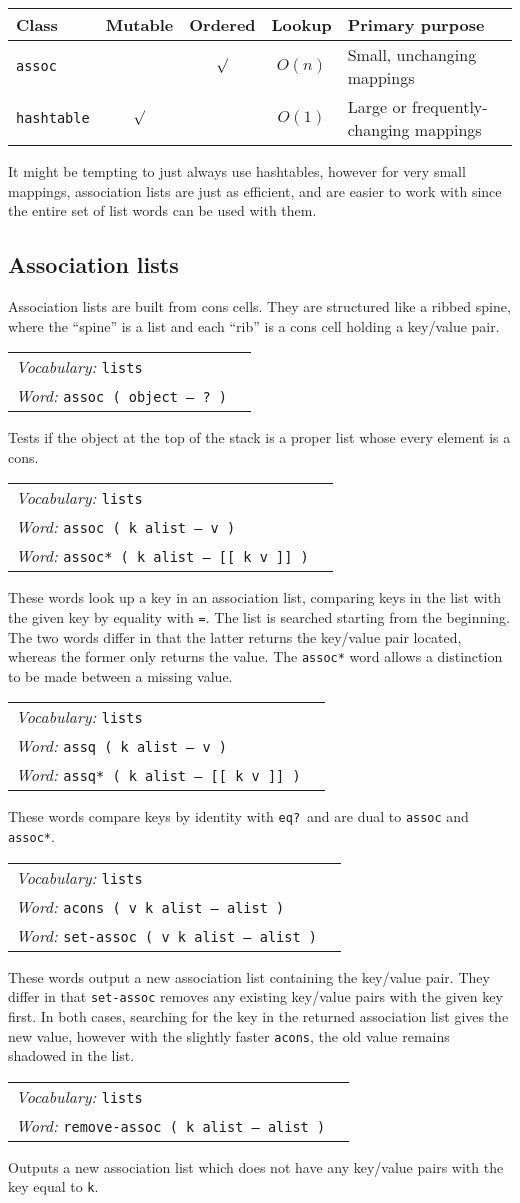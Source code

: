 \documentclass{book}
\newcommand{\vocabulary}[1]{\emph{Vocabulary:} \texttt{#1}&\\}
\newcommand{\ordinaryword}[2]{\index{\texttt{#1}}\emph{Word:} \texttt{#2}&\\}
\newcommand{\wordtable}[1]{

\begin{tabularx}{12cm}[t]{lX}
\hline
#1
\hline
\end{tabularx}

}
\begin{document}
\begin{tabular}[t]{l|c|c|c|l}
Class&Mutable&Ordered&Lookup&Primary purpose\\
\hline
\texttt{assoc}&&$\surd$&$O(n)$&Small, unchanging mappings\\
\texttt{hashtable}&$\surd$&&$O(1)$&Large or frequently-changing mappings
\end{tabular}

It might be tempting to just always use hashtables, however for very small mappings, association lists are just as efficient, and are easier to work with since the entire set of list words can be used with them.

\subsection{Association lists}


Association lists are built from cons cells. They are structured like a ribbed spine, where the ``spine'' is a list and each ``rib'' is a cons cell holding a key/value pair.

\wordtable{
\vocabulary{lists}
\ordinaryword{assoc?}{assoc ( object -- ?~)}
}
Tests if the object at the top of the stack is a proper list whose every element is a cons.

\wordtable{
\vocabulary{lists}
\ordinaryword{assoc}{assoc ( k alist -- v )}
\ordinaryword{assoc*}{assoc* ( k alist -- [[ k v ]] )}
}
These words look up a key in an association list, comparing keys in the list with the given key by equality with \texttt{=}. The list is searched starting from the beginning. The two words differ in that the latter returns the key/value pair located, whereas the former only returns the value. The \texttt{assoc*} word allows a distinction to be made between a missing value.
\wordtable{
\vocabulary{lists}
\ordinaryword{assq}{assq ( k alist -- v )}
\ordinaryword{assq*}{assq* ( k alist -- [[ k v ]] )}
}
These words compare keys by identity with \texttt{eq?}~and are dual to \texttt{assoc} and \texttt{assoc*}.
\wordtable{
\vocabulary{lists}
\ordinaryword{acons}{acons ( v k alist -- alist )}
\ordinaryword{set-assoc}{set-assoc ( v k alist -- alist )}
}
These words output a new association list containing the key/value pair.
They differ in that \texttt{set-assoc} removes any existing key/value pairs with the given key first. In both cases, searching for the key in the returned association list gives the new value, however with the slightly faster \texttt{acons}, the old value remains shadowed in the list.
\wordtable{
\vocabulary{lists}
\ordinaryword{remove-assoc}{remove-assoc ( k alist -- alist )}

}
Outputs a new association list which does not have any key/value pairs with the key equal to \texttt{k}.
\end{document}
